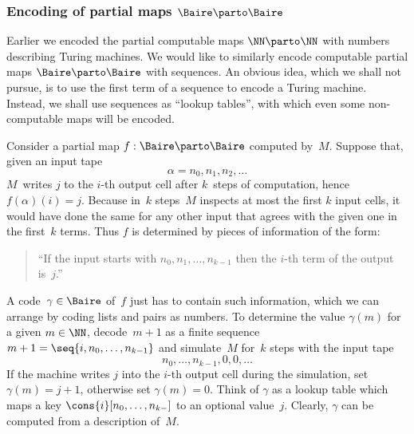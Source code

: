 \subsubsection{Encoding of partial maps $\Baire \parto \Baire$}
\label{sec:encoding-maps-baire}

Earlier we encoded the partial computable maps $\NN \parto \NN$ with numbers describing Turing machines. We would like to similarly encode computable partial maps $\Baire \parto \Baire$ with sequences. An obvious idea, which we shall not pursue, is to use the first term of a sequence to encode a Turing machine. Instead, we shall use sequences as ``lookup tables'', with which even some non-computable maps will be encoded.

Consider a partial map $f : \Baire \parto \Baire$ computed by~$M$.
Suppose that, given an input tape
%
\begin{equation*}
  \alpha = n_0, n_1, n_2, \ldots
\end{equation*}
%
$M$~writes $j$ to the $i$-th output cell after $k$~steps of computation,
hence $f(\alpha)(i) = j$. Because in~$k$ steps~$M$ inspects at most the first $k$ input cells, it would have done the same for any other input that agrees with the given one in the first~$k$ terms. Thus $f$ is determined by pieces of information of the form:
%
\begin{quote}
  ``If the input starts with $n_0, n_1, \ldots, n_{k-1}$ then the $i$-th term of the output is~$j$.''
\end{quote}
%
A code~$\gamma \in \Baire$ of~$f$ just has to contain such information, which we can arrange by coding lists and pairs as numbers. To determine the value $\gamma(m)$ for a given $m \in \NN$, decode~$m + 1$ as a finite sequence $m + 1 = \seq{i, n_0, \ldots, n_{k-1}}$ and simulate~$M$ for~$k$ steps with the input tape
%
\begin{equation*}
  n_0, \ldots, n_{k-1}, 0, 0, \ldots
\end{equation*}
%
If the machine writes $j$ into the $i$-th output cell during the simulation, set $\gamma(m) = j + 1$, otherwise set $\gamma(m) = 0$.
%
Think of $\gamma$ as a lookup table which maps a key $\cons{i}[n_0, \ldots, n_{k-}]$ to an optional value~$j$.
%
Clearly, $\gamma$ can be computed from a description of~$M$.

